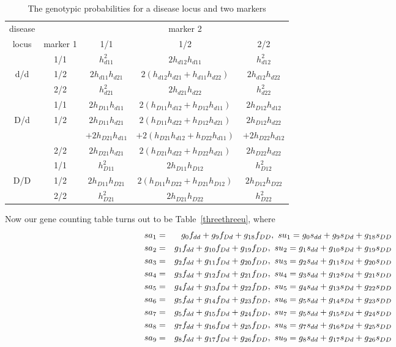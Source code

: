 \begin{table}[h]
\centering
\caption{The genotypic probabilities for a disease locus and two markers\label{threethreeg}}
\vskip 0.3cm
\begin{tabular}{ccccc}
\hline
disease&& \multicolumn{3}{c}{marker 2}\\ \cline{3-5}
locus& marker 1& 1/1 & 1/2 & 2/2 \\
\hline
   & 1/1 &   $h_{d11}^2$ &
             $2 h_{d12} h_{d11}$ &
             $h_{d12}^2$ \\
d/d& 1/2 &   $2 h_{d11} h_{d21}$ &
             $2 (h_{d12} h_{d21}+h_{d11} h_{d22})$ &
             $2 h_{d12} h_{d22}$ \\
   & 2/2 &   $h_{d21}^2$ &
             $2 h_{d21} h_{d22}$ &
             $h_{d22}^2$ \\
   & 1/1 &   $2 h_{D11} h_{d11}$ &
             $2 (h_{D11} h_{d12}+h_{D12} h_{d11})$ &
             $2 h_{D12} h_{d12}$ \\
D/d& 1/2 &   $2 h_{D11} h_{d21}$ &
             $2 (h_{D11} h_{d22}+h_{D12} h_{d21})$ &
             $2 h_{D12} h_{d22}$ \\
          && $+2 h_{D21} h_{d11}$&
             $+2 (h_{D21} h_{d12}+h_{D22} h_{d11})$ &
             $+2 h_{D22} h_{d12}$\\
   & 2/2 &   $2 h_{D21} h_{d21}$  &
             $2 (h_{D21} h_{d22}+h_{D22} h_{d21})$ &
             $2 h_{D22} h_{d22}$ \\
   & 1/1 &   $h_{D11}^2$  &
             $2 h_{D11} h_{D12}$ &
             $h_{D12}^2$  \\
D/D& 1/2 &   $2 h_{D11} h_{D21}$ &
             $2 (h_{D11} h_{D22}+h_{D21} h_{D12})$ &
             $2 h_{D12} h_{D22}$ \\
   & 2/2 &   $h_{D21}^2$ &
             $2 h_{D21} h_{D22}$ &
             $h_{D22}^2$ \\
\hline
\end{tabular}
\end{table}

Now our gene counting table turns out to be Table~\ref{threethreeu}, where
\begin{eqnarray*}
  sa_1&=&g_{0} f_{dd}+g_{9} f_{Dd}+g_{18} f_{DD}, \  su_1 = g_{0} s_{dd}+g_{9} s_{Dd}+g_{18} s_{DD}\cr
  sa_2&=&g_{1} f_{dd}+g_{10} f_{Dd}+g_{19} f_{DD},\  su_2 = g_{1} s_{dd}+g_{10} s_{Dd}+g_{19} s_{DD}\cr
  sa_3&=&g_{2} f_{dd}+g_{11} f_{Dd}+g_{20} f_{DD},\  su_3 = g_{2} s_{dd}+g_{11} s_{Dd}+g_{20} s_{DD}\cr
  sa_4&=&g_{3} f_{dd}+g_{12} f_{Dd}+g_{21} f_{DD},\  su_4 = g_{3} s_{dd}+g_{12} s_{Dd}+g_{21} s_{DD}\cr
  sa_5&=&g_{4} f_{dd}+g_{13} f_{Dd}+g_{22} f_{DD},\  su_5 = g_{4} s_{dd}+g_{13} s_{Dd}+g_{22} s_{DD}\cr
  sa_6&=&g_{5} f_{dd}+g_{14} f_{Dd}+g_{23} f_{DD},\  su_6 = g_{5} s_{dd}+g_{14} s_{Dd}+g_{23} s_{DD}\cr
  sa_7&=&g_{5} f_{dd}+g_{15} f_{Dd}+g_{24} f_{DD},\  su_7 = g_{5} s_{dd}+g_{15} s_{Dd}+g_{24} s_{DD}\cr
  sa_8&=&g_{7} f_{dd}+g_{16} f_{Dd}+g_{25} f_{DD},\  su_8 = g_{7} s_{dd}+g_{16} s_{Dd}+g_{25} s_{DD}\cr
  sa_9&=&g_{8} f_{dd}+g_{17} f_{Dd}+g_{26} f_{DD},\  su_9 = g_{8} s_{dd}+g_{17} s_{Dd}+g_{26} s_{DD}
\end{eqnarray*}

